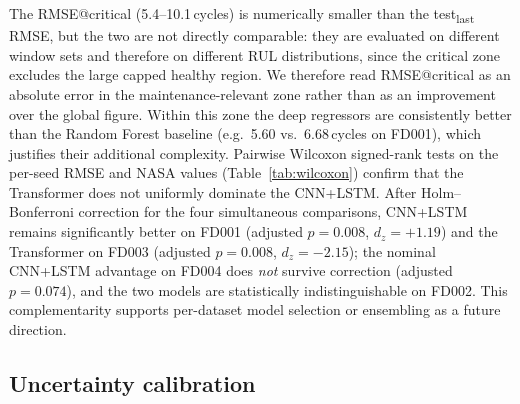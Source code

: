 \documentclass[5p,times,authoryear]{elsarticle}
\begin{document}
The RMSE@critical (5.4--10.1\,cycles) is numerically smaller than the test\textsubscript{last} RMSE, but the two are not directly comparable: they are evaluated on different window sets and therefore on different RUL distributions, since the critical zone excludes the large capped healthy region. We therefore read RMSE@critical as an absolute error in the maintenance-relevant zone rather than as an improvement over the global figure. Within this zone the deep regressors are consistently better than the Random Forest baseline (e.g.\ 5.60 vs.\ 6.68\,cycles on FD001), which justifies their additional complexity. Pairwise Wilcoxon signed-rank tests on the per-seed RMSE and NASA values (Table~\ref{tab:wilcoxon}) confirm that the Transformer does not uniformly dominate the CNN+LSTM. After Holm--Bonferroni correction for the four simultaneous comparisons, CNN+LSTM remains significantly better on FD001 (adjusted $p{=}0.008$, $d_z{=}+1.19$) and the Transformer on FD003 (adjusted $p{=}0.008$, $d_z{=}-2.15$); the nominal CNN+LSTM advantage on FD004 does \emph{not} survive correction (adjusted $p{=}0.074$), and the two models are statistically indistinguishable on FD002. This complementarity supports per-dataset model selection or ensembling as a future direction.

\begin{table}[!t]
\centering
\caption{Paired Wilcoxon signed-rank test (two-sided) on per-seed RMSE, $N_{\mathrm{seeds}}{=}10$. $\Delta$RMSE and $d_z$ are both defined as Transformer minus CNN+LSTM, so a \emph{positive} value favours CNN+LSTM (lower RMSE). $p_{\mathrm{Holm}}$ is the Holm--Bonferroni-adjusted $p$-value across the four datasets; significance uses $p_{\mathrm{Holm}}$.}
\label{tab:wilcoxon}
\small
{}
\end{table}

\subsection{Uncertainty calibration}\label{sec:results-mc}
\end{document}
